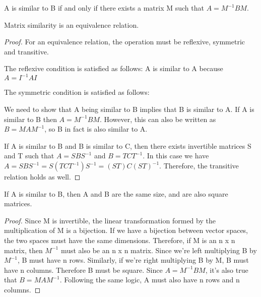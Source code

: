 \documentclass{article}
\begin{document}
    \theoremstyle{definition}
    \begin{definition}
        A is similar to B if and only if there exists a matrix M such that $A = M^{-1}BM$.
    \end{definition}
    
    \begin{theorem}
    Matrix similarity is an equivalence relation.
    \end{theorem}
    
    \begin{proof}
    For an equivalence relation, the operation must be reflexive, symmetric and transitive.
    
    The reflexive condition is satisfied as follows:
    A is similar to A because $A = I^{-1}AI$
    
    The symmetric condition is satisfied as follows:
    
    We need to show that A being similar to B implies that B is similar to A. If A is similar to B then $A = M^{-1}BM$. However, this can also be written as $B = MAM^{-1}$, so B in fact is also similar to A.
    
    If A is similar to B and B is similar to C, then there exists invertible matrices S and T such that $A = SBS^{-1}$ and $B = TCT^{-1}$. In this case we have $A = SBS^{-1} = S(TCT^{-1})S^{-1} = (ST)C(ST)^{-1}$. Therefore, the transitive relation holds as well.
    
    \end{proof}
    
    \begin{theorem}
    If A is similar to B, then A and B are the same size, and are also square matrices.
    \end{theorem}
    
    \begin{proof}
    Since M is invertible, the linear transformation formed by the multiplication of M is a bijection. If we have a bijection between vector spaces, the two spaces must have the same dimensions. Therefore, if M is an n x n matrix, then $M^{-1}$ must also be an n x n matrix. Since we're left multiplying B by $M^{-1}$, B must have n rows. Similarly, if we're right multiplying B by M, B must have n columns. Therefore B must be square. Since $A = M^{-1}BM$, it's also true that $B = MAM^{-1}$. Following the same logic, A must also have n rows and n columns.
    \end{proof}
    
\end{document}
